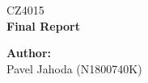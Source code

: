 \documentclass[12pt,a4paper]{article}
\begin{document}
\begin{titlepage}
  \thispagestyle{fancy}

  \vspace*{\fill}
  \begin{center}
    {\fontsize{20}{30}\selectfont CZ4015}\\[1cm]
    {\fontsize{30}{100}\selectfont \textbf{Final Report}}\\[4.2cm]
  \end{center}

  \vspace*{\fill}

  {\fontsize{10}{10} \selectfont \noindent
  \textbf{Author:}\\
  Pavel Jahoda (N1800740K)
  }
\end{titlepage}

\renewcommand{\headrulewidth}{0.4pt}
\renewcommand{\footrulewidth}{0.4pt}


\tableofcontents

\newpage

\end{document}
